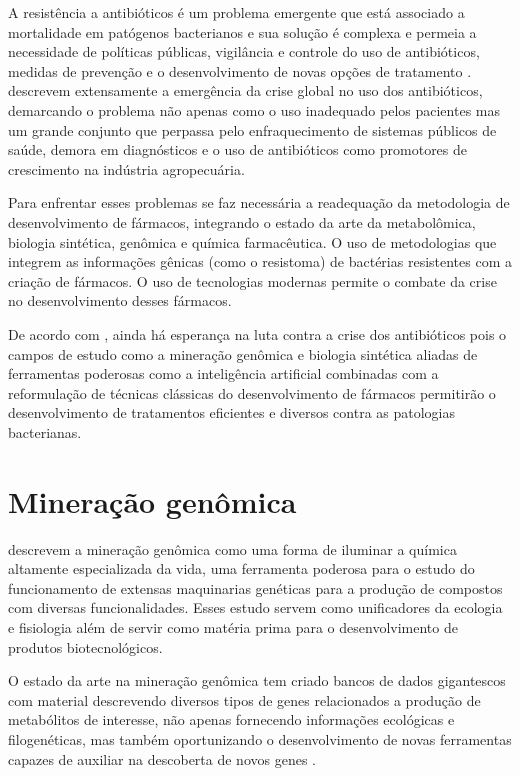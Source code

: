 A resistência a antibióticos é um problema emergente que está associado a mortalidade em patógenos bacterianos e sua solução
é complexa e permeia a necessidade de políticas públicas, vigilância e controle do uso de antibióticos, medidas de prevenção 
e o desenvolvimento de novas opções de tratamento \cite{frieri2017antibiotic}.   descrevem
extensamente a emergência da crise global no uso dos antibióticos, demarcando o problema não apenas como 
o uso inadequado pelos pacientes mas um grande conjunto que perpassa pelo enfraquecimento de sistemas
públicos de saúde, demora em diagnósticos e o uso de antibióticos como promotores de crescimento
na indústria agropecuária.

Para enfrentar esses problemas se faz necessária a readequação da metodologia de desenvolvimento
de fármacos, integrando o estado da arte da metabolômica, biologia sintética, genômica e química farmacêutica.
O uso de metodologias que integrem as informações gênicas (como o resistoma) de bactérias resistentes 
com a criação de fármacos. O uso de tecnologias modernas permite o combate da crise no 
desenvolvimento desses fármacos\cite{brown2016antibacterial}.

De acordo com , ainda há esperança na luta contra a crise dos antibióticos pois
o campos de estudo como a mineração genômica e biologia sintética aliadas de ferramentas poderosas como
a inteligência artificial combinadas com a reformulação de técnicas clássicas do desenvolvimento de fármacos
permitirão o desenvolvimento de tratamentos eficientes e diversos contra as patologias bacterianas. 

\section{Mineração genômica}
 descrevem a mineração genômica como uma forma de iluminar a química
altamente especializada da vida, uma ferramenta poderosa para o estudo do funcionamento de extensas
maquinarias genéticas para a produção de compostos com diversas funcionalidades. Esses estudo servem
como unificadores da ecologia e fisiologia além de servir como matéria prima para o desenvolvimento
de produtos biotecnológicos.

O estado da arte na mineração genômica tem criado bancos de dados gigantescos
com material descrevendo diversos tipos de genes relacionados a produção de metabólitos
de interesse, não apenas fornecendo informações ecológicas e filogenéticas, mas também oportunizando
o desenvolvimento de novas ferramentas capazes de auxiliar na descoberta de novos genes \cite{chevrette2021confluence}.

